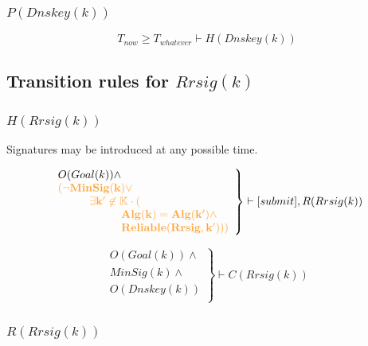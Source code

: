 \documentclass[twoside,english, a4paper]{article}
\newcommand{\highlightMinSig}[1]{\textcolor{MinSig}{\bf{#1}}}
\newcommand{\mathbox}[1]{#1}
\begin{document}
\subsubsection{$P(Dnskey(k))$}

\mathbox{

\highlightMinSig{
	\begin{equation}
			T_{now} \geq T_{whatever} \vdash H(Dnskey(k))
	\end{equation}
	}
}

\subsection{Transition rules for $Rrsig(k)$}

\subsubsection{$H(Rrsig(k))$}

\mathbox{
	Signatures may be introduced at any possible time.

	\begin{equation}
		\left.
		\begin{array}{l}
			O(Goal(k)) \wedge \\
\highlightMinSig{	(\neg MinSig(k) \vee }\\
\highlightMinSig{\hskip 1cm	\exists k' \not \in \mathbb{K}\cdot (}\\
\highlightMinSig{\hskip 2cm		Alg(k)=Alg(k') \wedge }\\
\highlightMinSig{\hskip 2cm		Reliable(Rrsig, k'))) }\\
		\end{array}
		\right\} \vdash [submit], R(Rrsig(k))
	\end{equation}

\highlightMinSig{
	\begin{equation}
		\left.
		\begin{array}{l}
			O(Goal(k)) \wedge \\
			MinSig(k) \wedge \\
			O(Dnskey(k)) \\
		\end{array}
		\right\} \vdash C(Rrsig(k))
	\end{equation}
	}
}

\subsubsection{$R(Rrsig(k))$}
\end{document}
